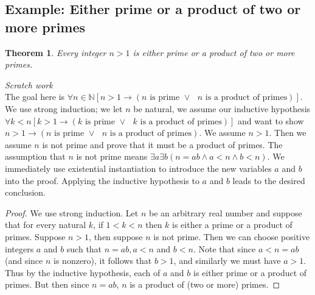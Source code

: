 \documentclass{report}
\newtheorem*{theorem}{Theorem}
\theoremstyle{definition}
\begin{document}
\subsection{Example: Either prime or a product of two or more primes}
\begin{theorem}
Every integer $n>1$ is either prime or a product of two or more primes. 
\end{theorem}
\noindent\textit{Scratch work}\\
The goal here is $\forall n\in\mathbb N[n>1\to(n\text{ is prime }\lor\text{ $n$ is a product of primes})]$. We use strong induction; we let $n$ be natural, we assume our inductive hypothesis
$\forall k<n[k>1\to(k\text{ is prime }\lor\text{ $k$ is a product of primes})]$ and want to show 
$n>1\to(n\text{ is prime }\lor\text{ $n$ is a product of primes})$.
We assume $n>1$. Then we assume $n$ is not prime and prove that it must be a product of primes.
The assumption that $n$ is not prime means $\exists a\exists b(n=ab\land a<n\land b<n)$. We immediately use existential instantiation to introduce the new variables $a$ and $b$ into the proof.
Applying the inductive hypothesis to $a$ and $b$ leads to the desired conclusion.
\begin{proof}
We use strong induction. Let $n$ be an arbitrary real number and suppose that for every natural $k$, if $1<k<n$ then $k$ is either a prime or a product of primes. 
Suppose $n>1$, then suppose $n$ is not prime. Then we
can choose positive integers $a$ and $b$ such that $n=ab,a<n$ and $b<n$.
Note that since $a<n=ab$ (and since $n$ is nonzero), it follows that $b>1$, and similarly we must have $a>1$. Thus by the inductive hypothesis, each of $a$ and $b$ is either prime or a product 
of primes. But then since $n=ab$, $n$ is a product of (two or more) primes.
\end{proof}
\newpage
\end{document}
